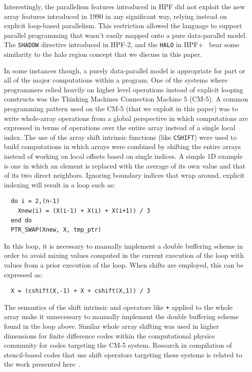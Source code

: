Interestingly, the parallelism features introduced in HPF did not
exploit the new array features introduced in 1990 in any significant
way, relying instead on explicit loop-based parallelism.  This
restriction allowed the language to support parallel programming that
wasn't easily mapped onto a pure data-parallel model.  The {\tt SHADOW}
directive introduced in HPF-2, and the {\tt HALO} in HPF+~\citep{benkner99hpf}
bear some similarity to the halo region concept that we discuss in this 
paper.

In some instances though, a purely data-parallel model is appropriate
for part or all of the major computations within a program.  One of
the systems where programmers relied heavily on higher level
operations instead of explicit looping constructs was the Thinking
Machines Connection Machine 5 (CM-5).  A common programming pattern
used on the CM-5 (that we exploit in this paper) was to write
whole-array operations from a global perspective in which computations
are expressed in terms of operations over the entire array instead of
a single local index.  The use of the array shift intrinsic functions
(like {\tt CSHIFT}) were used to build computations in which arrays
were combined by shifting the entire arrays instead of working on
local offsets based on single indices.  A simple 1D example is one in
which an element is replaced with the average of its own value and
that of its two direct neighbors.  Ignoring boundary indices that wrap
around, explicit indexing will result in a loop such as:

{\small
\begin{verbatim}
  do i = 2,(n-1)
    Xnew(i) = (X(i-1) + X(i) + X(i+1)) / 3
  end do
  PTR_SWAP(Xnew, X, tmp_ptr)
\end{verbatim}
}

\noindent In this loop, it is necessary to manually implement a double buffering scheme
in order to avoid mixing values computed in the current execution of the loop with values from a 
prior execution of the loop. When shifts are employed, this can be expressed as:

{\small
\begin{verbatim}
  X = (cshift(X,-1) + X + cshift(X,1)) / 3
\end{verbatim}
}

\noindent
The semantics of the shift intrinsic and operators like {\tt +}
applied to the whole array make it unnecessary to manually implement
the double buffering scheme found in the loop above.  Similar whole
array shifting was used in higher dimensions for finite difference
codes within the computational physics community for codes targeting
the CM-5 system.  Research in compilation of stencil-based codes that
use shift operators targeting these systems is related to the work
presented here~\citep{stencil-compiler}.

